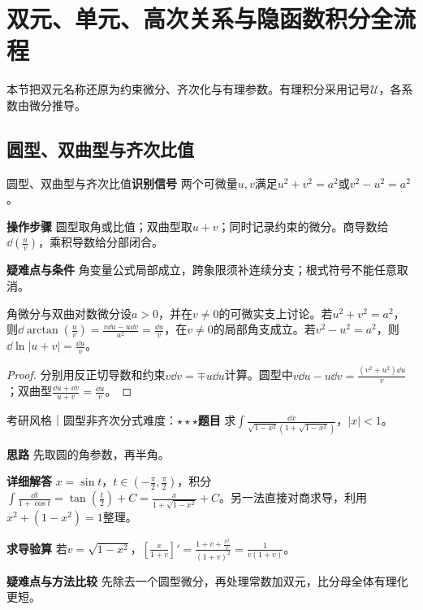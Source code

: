 \section{双元、单元、高次关系与隐函数积分全流程}\label{ic:indefinite_dual_complete}

\begin{examtip}本节把双元名称还原为约束微分、齐次化与有理参数。有理积分采用记号$\mathcal U$，各系数由微分推导。\end{examtip}

\subsection{圆型、双曲型与齐次比值}\label{ic:indefinite_dual_complete:differentials}\begin{method}{圆型、双曲型与齐次比值}\textbf{识别信号} 两个可微量$u,v$满足$u^2+v^2=a^2$或$v^2-u^2=a^2$。\par \textbf{操作步骤} 圆型取角或比值；双曲型取$u+v$；同时记录约束的微分。商导数给$\dd(\frac{u}{v})$，乘积导数给分部闭合。\par \textbf{疑难点与条件} 角变量公式局部成立，跨象限须补连续分支；根式符号不能任意取消。\end{method}

\begin{theorem}{角微分与双曲对数微分}设$a>0$，并在$v\ne0$的可微实支上讨论。若$u^2+v^2=a^2$，则$\dd\arctan(\frac{u}{v})=\frac{v\dd u-u\dd v}{a^2}=\frac{\dd u}{v}$，在$v\ne0$的局部角支成立。若$v^2-u^2=a^2$，则$\dd\ln|u+v|=\frac{\dd u}{v}$。\end{theorem}\begin{proof}分别用反正切导数和约束$v\dd v=\mp u\dd u$计算。圆型中$v\dd u-u\dd v=\frac{(v^2+u^2)\dd u}{v}$；双曲型$\frac{\dd u+\dd v}{u+v}=\frac{\dd u}{v}$。\end{proof}

\begin{example}{考研风格｜圆型非齐次分式}{难度：$\star\star\star$}\label{ic:ex:indefinite_dual_complete:circlefraction}\textbf{题目} 求$\int\frac{\dd x}{\sqrt{1-x^2}(1+\sqrt{1-x^2})}$，$|x|<1$。\par \textbf{思路} 先取圆的角参数，再半角。\par \textbf{详细解答} $x=\sin t$，$t\in(-\frac{\pi}{2},\frac{\pi}{2})$，积分$\int\frac{\dd t}{1+\cos t}=\tan(\frac{t}{2})+C=\frac{x}{1+\sqrt{1-x^2}}+C$。另一法直接对商求导，利用$x^2+(1-x^2)=1$整理。\par \textbf{求导验算} 若$v=\sqrt{1-x^2}$，$[\frac{x}{1+v}]'=\frac{1+v+\frac{x^2}{v}}{(1+v)^2}=\frac{1}{v(1+v)}$。\par \textbf{疑难点与方法比较} 先除去一个圆型微分，再处理常数加双元，比分母全体有理化更短。\end{example}

